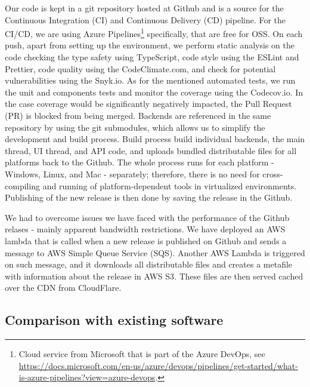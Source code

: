 \documentclass[thesismargins, english, thesislinespacing, onelinechapterstyle, upjsfrontpage]{rnthesis}
\begin{document}
Our code is kept in a git repository hosted at Github and is a source for the Continuous Integration (CI) and Continuous Delivery (CD) pipeline.
For the CI/CD, we are using Azure Pipelines\footnote{Cloud service from Microsoft that is part of the Azure DevOps, see \url{https://docs.microsoft.com/en-us/azure/devops/pipelines/get-started/what-is-azure-pipelines?view=azure-devops}.} specifically, that are free for OSS.
On each push, apart from setting up the environment, we perform static analysis on the code checking the type safety using TypeScript, code style using the ESLint and Prettier, code quality using the CodeClimate.com, and check for potential vulnerabilities using the Snyk.io.
As for the mentioned automated tests, we run the unit and components tests and monitor the coverage using the Codecov.io.
In the case coverage would be significantly negatively impacted, the Pull Request (PR) is blocked from being merged.
Backends are referenced in the same repository by using the git submodules, which allows us to simplify the development and build process.
Build process build individual backends, the main thread, UI thread, and API code, and uploads bundled distributable files for all platforms back to the Github.
The whole process runs for each platform - Windows, Linux, and Mac - separately; therefore, there is no need for cross-compiling and running of platform-dependent tools in virtualized environments.
Publishing of the new release is then done by saving the release in the Github.

We had to overcome issues we have faced with the performance of the Github relases - mainly apparent bandwidth restrictions.
We have deployed an AWS lambda that is called when a new release is published on Github and sends a message to AWS Simple Queue Service (SQS).
Another AWS Lambda is triggered on such message, and it downloads all distributable files and creates a metafile with information about the release in AWS S3.
These files are then served cached over the CDN from CloudFlare.

\subsection{Comparison with existing software}
\end{document}
